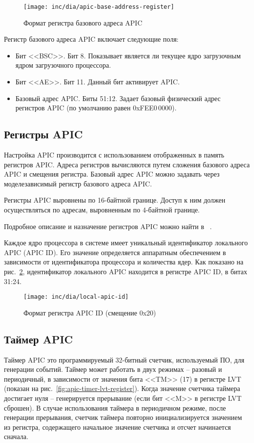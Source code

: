 \begin{figure}[ht!]
  \centering
  \texttt{[image: inc/dia/apic-base-address-register]}
  \caption{Формат регистра базового адреса APIC}
  \label{fig:apic-base-address-register}
\end{figure}

Регистр базового адреса APIC включает следующие поля:
\begin{itemize}
\item Бит <<BSC>>. Бит 8. Показывает является ли текущее ядро загрузочным ядром загрузочного процессора.
\item Бит <<AE>>. Бит 11. Данный бит активирует APIC.
\item Базовый адрес APIC. Биты 51:12. Задает базовый физический адрес регистров APIC (по умолчанию
	равен 0xFEE0\,0000).
\end{itemize}

\subsection{Регистры APIC}
Настройка APIC производится с использованием отображенных в память регистров APIC.
Адреса регистров вычисляются путем сложения базового адреса APIC и смещения регистра.
Базовый адрес APIC можно задавать через моделезависимый регистр базового адреса APIC.

Регистры APIC выровнены по 16-байтной границе. Доступ к ним должен осуществляться
по адресам, выровненным по 4-байтной границе.

Подробное описание и назначение регистров APIC можно найти в ~\cite{amd_pm_v2}.

Каждое ядро процессора в системе имеет уникальный идентификатор локального APIC (APIC ID).
Его значение определяется аппаратным обеспечением в зависимости от идентификатора процессора
и количества ядер. Как показано на рис.~\ref{fig:local-apic-id}, идентификатор локального APIC
находится в регистре APIC ID, в битах 31:24.

\begin{figure}[ht!]
  \centering
  \texttt{[image: inc/dia/local-apic-id]}
  \caption{Формат регистра APIC ID (смещение 0x20)}
  \label{fig:local-apic-id}
\end{figure}

\subsection{Таймер APIC}
Таймер APIC это программируемый 32-битный счетчик, используемый ПО, для генерации событий.
Таймер может работать в двух режимах -- разовый и периодичный, в зависимости от значения бита <<TM>> (17)
в регистре LVT (показан на рис.~\ref{fig:apic-timer-lvt-register}). Когда значение счетчика таймера
достигает нуля -- генерируется прерывание (если бит <<M>> в регистре LVT сброшен). В случае использования
таймера в периодичном режиме, после генерации прерывания, счетчик таймера повторно инициализируется
значением из регистра, содержащего начальное значение счетчика и отсчет начинается сначала.


